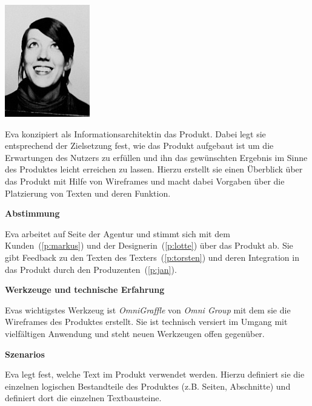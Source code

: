 \begin{multicols}{2}

\begin{center}
\includegraphics[width=0.5\columnwidth]{media/eva.jpg}
\end{center}


Eva konzipiert als Informationsarchitektin das Produkt. Dabei legt sie entsprechend der Zielsetzung fest, wie das Produkt aufgebaut ist um die Erwartungen des Nutzers zu erfüllen und ihn das gewünschten Ergebnis im Sinne des Produktes leicht erreichen zu lassen. Hierzu erstellt sie einen Überblick über das Produkt mit Hilfe von Wireframes und macht dabei Vorgaben über die Platzierung von Texten und deren Funktion.

\textbf{Abstimmung}

Eva arbeitet auf Seite der Agentur und stimmt sich mit dem Kunden~(\ref{p:markus}) und der Designerin~(\ref{p:lotte}) über das Produkt ab. Sie gibt Feedback zu den Texten des Texters~(\ref{p:torsten}) und deren Integration in das Produkt durch den Produzenten~(\ref{p:jan}).

\textbf{Werkzeuge und technische Erfahrung}

Evas wichtigstes Werkzeug ist \emph{OmniGraffle} von \emph{Omni Group} mit dem sie die Wireframes des Produktes erstellt. Sie ist technisch versiert im Umgang mit vielfältigen Anwendung und steht neuen Werkzeugen offen gegenüber.

\columnbreak

\textbf{Szenarios}

Eva legt fest, welche Text im Produkt verwendet werden. Hierzu definiert sie die einzelnen logischen Bestandteile des Produktes (z.B. Seiten, Abschnitte) und definiert dort die einzelnen Textbausteine.


\end{multicols}
